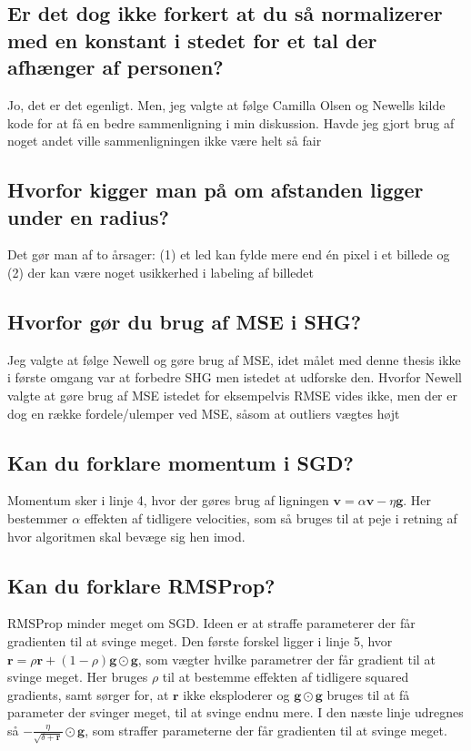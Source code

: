 \documentclass[a4paper]{article}
\begin{document}
\subsection{Er det dog ikke forkert at du så normalizerer med en konstant i stedet for et tal der afhænger af personen?}
Jo, det er det egenligt. Men, jeg valgte at følge Camilla Olsen og Newells kilde kode for at få en bedre sammenligning i min diskussion. Havde jeg gjort brug af noget andet ville sammenligningen ikke være helt så fair

\subsection{Hvorfor kigger man på om afstanden ligger under en radius?}
Det gør man af to årsager: (1) et led kan fylde mere end én pixel i et billede og (2) der kan være noget usikkerhed i labeling af billedet

\subsection{Hvorfor gør du brug af MSE i SHG?}
Jeg valgte at følge Newell og gøre brug af MSE, idet målet med denne thesis ikke i første omgang var at forbedre SHG men istedet at udforske den. Hvorfor Newell valgte at gøre brug af MSE istedet for eksempelvis RMSE vides ikke, men der er dog en række fordele/ulemper ved MSE, såsom at outliers vægtes højt

\subsection{Kan du forklare momentum i SGD?}
Momentum sker i linje 4, hvor der gøres brug af ligningen $\bm{v} = \alpha \bm{v} - \eta \bm{g}$. Her bestemmer $\alpha$ effekten af tidligere velocities, som så bruges til at peje i retning af hvor algoritmen skal bevæge sig hen imod.

\subsection{Kan du forklare RMSProp?}
RMSProp minder meget om SGD. Ideen er at straffe parameterer der får gradienten til at svinge meget. Den første forskel ligger i linje 5, hvor $\bm{r} = \rho \bm{r} + (1 - \rho) \bm{g} \odot \bm{g}$, som vægter hvilke parametrer der får gradient til at svinge meget. Her bruges $\rho$ til at bestemme effekten af tidligere squared gradients, samt sørger for, at $\bm{r}$ ikke eksploderer og $\bm{g} \odot \bm{g}$ bruges til at få parameter der svinger meget, til at svinge endnu mere. I den næste linje udregnes så $- \frac{\eta}{\sqrt{\delta + \bm{r}}} \odot \bm{g}$, som straffer parameterne der får gradienten til at svinge meget.
\end{document}
